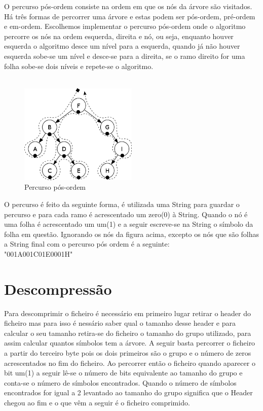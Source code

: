 \FloatBarrier
O percurso pós-ordem consiste na ordem em que os nós da árvore são visitados. Há três formas de percorrer uma árvore e estas podem ser pós-ordem, pré-ordem e em-ordem. Escolhemos implementar o percurso pós-ordem onde o algoritmo percorre os nós na ordem esquerda, direita e nó, ou seja, enquanto houver esquerda o algoritmo desce um nível para a esquerda, quando já não houver esquerda sobe-se um nível e desce-se para a direita, se o ramo direito for uma folha sobe-se dois níveis e repete-se o algoritmo.\\
\\
\begin{figure}[h]
  \caption{Percurso pós-ordem}
  \centering
    \includegraphics[width=0.50\textwidth]{sbt.png}
\end{figure}

\FloatBarrier

O percurso é feito da seguinte forma, é utilizada uma String para guardar o percurso e para cada ramo é acrescentado um zero(0) à String. Quando o nó é uma folha é acrescentado um um(1) e a seguir escreve-se na String o símbolo da folha em questão. Ignorando os nós da figura acima, excepto os nós que são folhas a String final com o percurso pós ordem é a seguinte:\\
\FloatBarrier
	"001A001C01E0001H"\\


\section{Descompressão}

Para descomprimir o ficheiro é necessário em primeiro lugar retirar o header do ficheiro mas para isso é nessário saber qual o tamanho desse header e para calcular o seu tamanho retira-se do ficheiro o tamanho do grupo utilizado, para assim calcular quantos símbolos tem a árvore. A seguir basta percorrer o ficheiro a partir do terceiro byte pois os dois primeiros são o grupo e o número de zeros acrescentados no fim do ficheiro. Ao percorrer então o ficheiro quando aparecer o bit um(1) a seguir lê-se o número de bits equivalente ao tamanho do grupo e conta-se o número de símbolos encontrados. Quando o número de símbolos encontrados for igual a 2 levantado ao tamanho do grupo significa que o Header chegou ao fim e o que vêm a seguir é o ficheiro comprimido.\\

